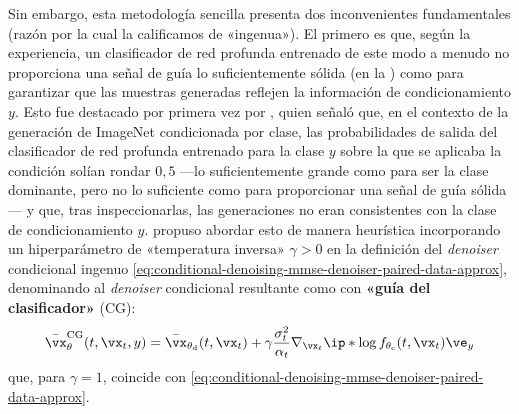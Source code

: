 \documentclass[../../book-main_es.tex]{subfiles}
\begin{document}
Sin embargo, esta metodología sencilla presenta dos inconvenientes fundamentales (razón por la cual
la calificamos de «ingenua»). El primero es
que, según la experiencia, un clasificador de red profunda entrenado de este modo a menudo no
proporciona una señal de guía lo suficientemente sólida (en la
) como para garantizar que
las muestras generadas reflejen la información de condicionamiento $y$. Esto fue destacado por primera vez
por \citet{Dhariwal2021-hg}, quien señaló que, en el contexto de la
generación de ImageNet condicionada por clase, las probabilidades
de salida del clasificador de red profunda entrenado para la clase $y$ sobre la que se
aplicaba la condición solían rondar
$0,5$ ---lo suficientemente grande como para ser la clase dominante, pero no lo suficiente como para proporcionar
una señal de guía sólida--- y que, tras inspeccionarlas, las generaciones no eran
consistentes con la clase de condicionamiento $y$. \citet{Dhariwal2021-hg} propuso
abordar esto de manera heurística incorporando un hiperparámetro de «temperatura inversa»
$\gamma > 0$
en la definición del \textit{denoiser} condicional ingenuo
\eqref{eq:conditional-denoising-mmse-denoiser-paired-data-approx},
denominando al
\textit{denoiser} condicional resultante como con
\textbf{«guía del clasificador»} (CG):
\begin{equation}\label{eq:conditional-denoising-mmse-denoiser-paired-data-approx-cg}
    \bar{\vx}_{\theta}^{\mathrm{CG}}(t, \vx_t, y)
    =
    \bar{\vx}_{\theta_{\mathrm{d}}}(t, \vx_t)
    + \gamma\frac{\sigma_t^2}{\alpha_t}
    \nabla_{\vx_t}
    \ip*{
        \log f_{\theta_{\mathrm{c}}}(t, \vx_t)
    }{
        \ve_{y}
    }
\end{equation}
que, para $\gamma = 1$, coincide con
\eqref{eq:conditional-denoising-mmse-denoiser-paired-data-approx}.
\end{document}
